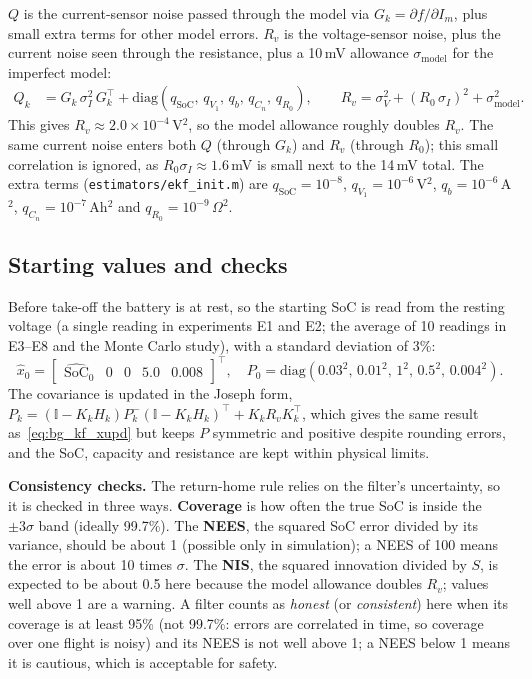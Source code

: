 $Q$ is the current-sensor noise passed through the model via $G_k = \partial f/\partial I_m$, plus small extra terms for other model errors. $R_v$ is the voltage-sensor noise, plus the current noise seen through the resistance, plus a 10\,mV allowance $\sigma_{\text{model}}$ for the imperfect model:
\begin{align}
  Q_k &= G_k\, \sigma_I^2\, G_k^{\top} + \mathrm{diag}\!\left(q_{\text{SoC}},\, q_{V_1},\, q_b,\, q_{C_n},\, q_{R_0}\right), \qquad
  R_v = \sigma_V^2 + \left(R_0\, \sigma_I\right)^2 + \sigma_{\text{model}}^2 .
  \label{eq:m_Q}
\end{align}
This gives $R_v \approx 2.0 \times 10^{-4}$\,V$^2$, so the model allowance roughly doubles $R_v$. The same current noise enters both $Q$ (through $G_k$) and $R_v$ (through $R_0$); this small correlation is ignored, as $R_0 \sigma_I \approx 1.6$\,mV is small next to the 14\,mV total. The extra terms (\texttt{estimators/ekf\_init.m}) are $q_{\text{SoC}} = 10^{-8}$, $q_{V_1} = 10^{-6}$\,V$^2$, $q_b = 10^{-6}$\,A$^2$, $q_{C_n} = 10^{-7}$\,Ah$^2$ and $q_{R_0} = 10^{-9}$\,$\Omega^2$.

\subsection{Starting values and checks}\label{sec:m_ekf_init}\label{sec:m_ekf_safeguards}\label{sec:m_ekf_consistency}

Before take-off the battery is at rest, so the starting SoC is read from the resting voltage (a single reading in experiments E1 and E2; the average of 10 readings in E3--E8 and the Monte Carlo study), with a standard deviation of 3\%:
\begin{equation}
  \hat{x}_0 = \begin{bmatrix} \widehat{\mathrm{SoC}}_0 & 0 & 0 & 5.0 & 0.008 \end{bmatrix}^{\top}, \quad P_0 = \mathrm{diag}\!\left(0.03^2,\, 0.01^2,\, 1^2,\, 0.5^2,\, 0.004^2\right).
  \label{eq:m_x0}
\end{equation}
The covariance is updated in the Joseph form, $P_k = (\mathbb{I} - K_k H_k) P_k^- (\mathbb{I} - K_k H_k)^{\top} + K_k R_v K_k^{\top}$, which gives the same result as~\eqref{eq:bg_kf_xupd} but keeps $P$ symmetric and positive despite rounding errors,\label{eq:m_joseph} and the SoC, capacity and resistance are kept within physical limits.

\textbf{Consistency checks.} The return-home rule relies on the filter's uncertainty, so it is checked in three ways. \textbf{Coverage} is how often the true SoC is inside the $\pm 3\sigma$ band (ideally 99.7\%). The \textbf{NEES}, the squared SoC error divided by its variance, should be about 1 (possible only in simulation); a NEES of 100 means the error is about 10 times $\sigma$. The \textbf{NIS}, the squared innovation divided by $S$, is expected to be about 0.5 here because the model allowance doubles $R_v$; values well above 1 are a warning. A filter counts as \emph{honest} (or \emph{consistent}) here when its coverage is at least 95\% (not 99.7\%: errors are correlated in time, so coverage over one flight is noisy) and its NEES is not well above 1; a NEES below 1 means it is cautious, which is acceptable for safety.

